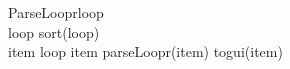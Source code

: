 \begin{pseudocode}{ParseLoopr}{loop}
\label{pc:parse_loop_func}
     \\
    loop \GETS sort(loop) \\

    \FORALL item \in loop \DO
    \BEGIN
        \IF item \in \Upsilon \THEN
            parseLoopr(item)
        \ELSE
            togui(item)
    \END
\end{pseudocode}
